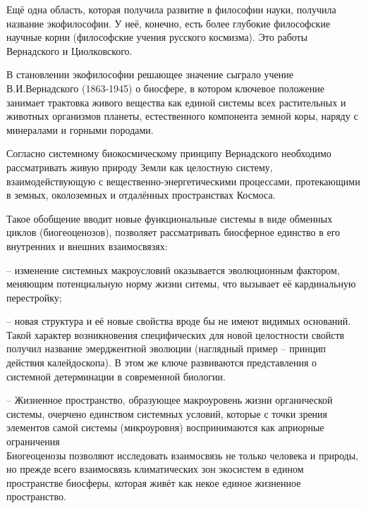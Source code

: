 \documentclass[exam_answers.tex]{subfiles}
\begin{document}
\renewcommand{\baselinestretch}{0.75}

Ещё одна область, которая получила развитие в философии науки, получила название экофилософии.
У неё, конечно, есть более глубокие философские научные корни (философские учения русского космизма).
Это работы Вернадского и Циолковского.

В становлении экофилософии решающее значение сыграло учение В.И.Вернадского (1863-1945) о биосфере, в котором ключевое положение занимает трактовка живого вещества как единой системы всех растительных и животных организмов планеты, естественного компонента земной коры, наряду с минералами и горными породами.

Согласно системному биокосмическому принципу Вернадского необходимо рассматривать живую природу Земли как целостную систему, взаимодействующую с вещественно-энергетическими процессами, протекающими в земных, околоземных и отдалённых пространствах Космоса.

Такое обобщение вводит новые функциональные системы в виде обменных циклов (биогеоценозов), позволяет рассматривать биосферное единство в его внутренних и внешних взаимосвязях:

-- изменение системных макроусловий оказывается эволюционным фактором, меняющим потенциальную норму жизни ситемы, что вызывает её кардинальную перестройку;

-- новая структура и её новые свойства вроде бы не имеют видимых оснований.
Такой характер возникновения специфических для новой целостности свойств получил название эмерджентной эволюции (наглядный пример – принцип действия калейдоскопа).
В этом же ключе развиваются представления о системной детерминации в современной биологии.

-- Жизненное пространство, образующее макроуровень жизни органической системы, очерчено единством системных условий, которые с точки зрения элементов самой системы (микроуровня) воспринимаются как априорные ограничения
\\

Биогеоценозы позволяют исследовать взаимосвязь не только человека и природы, но прежде всего взаимосвязь климатических зон экосистем в едином пространстве биосферы, которая живёт как некое единое жизненное пространство.
\end{document}
